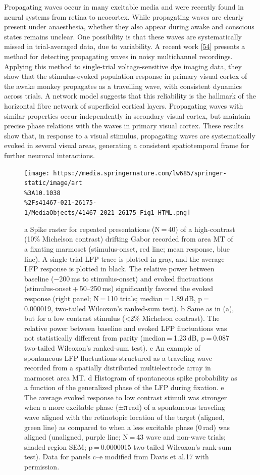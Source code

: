 Propagating waves occur in many excitable media and were recently found in neural systems from retina to neocortex. While propagating waves are clearly present under anaesthesia, whether they also appear during awake and conscious states remains unclear. One possibility is that these waves are systematically missed in trial-averaged data, due to variability. A recent work {[}\protect\hyperlink{ref-hGYLURVS}{54}{]} presents a method for detecting propagating waves in noisy multichannel recordings. Applying this method to single-trial voltage-sensitive dye imaging data, they show that the stimulus-evoked population response in primary visual cortex of the awake monkey propagates as a travelling wave, with consistent dynamics across trials. A network model suggests that this reliability is the hallmark of the horizontal fibre network of superficial cortical layers. Propagating waves with similar properties occur independently in secondary visual cortex, but maintain precise phase relations with the waves in primary visual cortex. These results show that, in response to a visual stimulus, propagating waves are systematically evoked in several visual areas, generating a consistent spatiotemporal frame for further neuronal interactions.

\begin{figure}
\hypertarget{fig:davis}{%
\centering
\texttt{[image: https://media.springernature.com/lw685/springer-static/image/art\\\%3A10.1038\\\%2Fs41467-021-26175-1/MediaObjects/41467\_2021\_26175\_Fig1\_HTML.png]}
\caption{a Spike raster for repeated presentations (N = 40) of a high-contrast (10\% Michelson contrast) drifting Gabor recorded from area MT of a fixating marmoset (stimulus-onset, red line; mean response, blue line). A single-trial LFP trace is plotted in gray, and the average LFP response is plotted in black. The relative power between baseline (−200 ms to stimulus-onset) and evoked fluctuations (stimulus-onset + 50--250 ms) significantly favored the evoked response (right panel; N = 110 trials; median = 1.89 dB, p = 0.000019, two-tailed Wilcoxon's ranked-sum test). b Same as in (a), but for a low contrast stimulus (\textless2\% Michelson contrast). The relative power between baseline and evoked LFP fluctuations was not statistically different from parity (median = 1.23 dB, p = 0.087 two-tailed Wilcoxon's ranked-sum test). c An example of spontaneous LFP fluctuations structured as a traveling wave recorded from a spatially distributed multielectrode array in marmoset area MT. d Histogram of spontaneous spike probability as a function of the generalized phase of the LFP during fixation. e The average evoked response to low contrast stimuli was stronger when a more excitable phase (±π rad) of a spontaneous traveling wave aligned with the retinotopic location of the target (aligned, green line) as compared to when a less excitable phase (0 rad) was aligned (unaligned, purple line; N = 43 wave and non-wave trials; shaded region SEM; p = 0.0000015 two-tailed Wilcoxon's rank-sum test). Data for panels c--e modified from Davis et al.17 with permission.}\label{fig:davis}
}
\end{figure}

